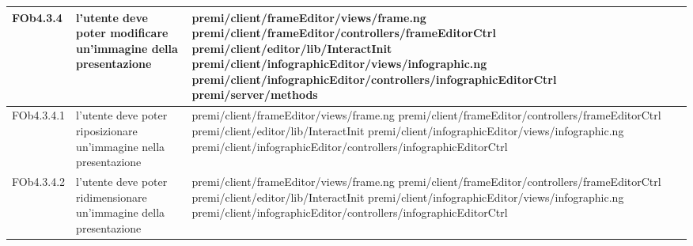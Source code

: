\begin{longtable}{|l|p{5cm}|p{7cm}|}
\hline
FOb4.3.4 & l'utente deve poter modificare un'immagine della presentazione & \hspace{0pt}premi/client/frameEditor/views/frame.ng \linebreak \linebreak premi/client/frameEditor/controllers/frameEditorCtrl \linebreak \linebreak premi/client/editor/lib/InteractInit \linebreak \linebreak premi/client/infographicEditor/views/infographic.ng \linebreak \linebreak premi/client/infographicEditor/controllers/infographicEditorCtrl  \linebreak \linebreak premi/server/methods \\
\hline
FOb4.3.4.1 & l'utente deve poter riposizionare un'immagine nella presentazione & \hspace{0pt}premi/client/frameEditor/views/frame.ng \linebreak \linebreak premi/client/frameEditor/controllers/frameEditorCtrl \linebreak \linebreak premi/client/editor/lib/InteractInit \linebreak \linebreak premi/client/infographicEditor/views/infographic.ng \linebreak \linebreak premi/client/infographicEditor/controllers/infographicEditorCtrl \\
\hline
FOb4.3.4.2 & l'utente deve poter ridimensionare un'immagine della presentazione & \hspace{0pt}premi/client/frameEditor/views/frame.ng \linebreak \linebreak premi/client/frameEditor/controllers/frameEditorCtrl \linebreak \linebreak premi/client/editor/lib/InteractInit \linebreak \linebreak premi/client/infographicEditor/views/infographic.ng \linebreak \linebreak premi/client/infographicEditor/controllers/infographicEditorCtrl \\

\end{longtable}
